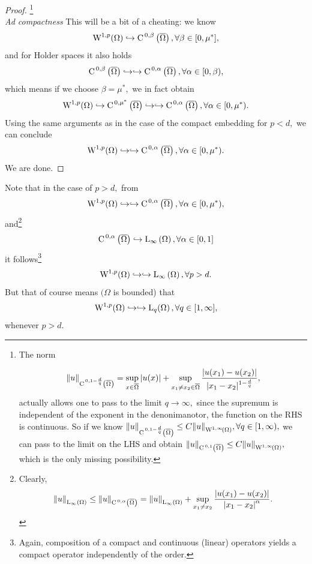 \documentclass{article}
\begin{document}
\begin{proof}
    \footnote{The norm

	    \[
		    \norm{u}_{\text{C}^{\!\, \,0,1- \frac{d}{q}}\!\,\left(\overline{\Omega} \right)} = \sup_{x \in \overline{\Omega}}|u(x)| + \sup_{x_1 \neq x_2 \in \overline{\Omega}} \frac{|u(x_1) - u(x_2)|}{|x_1 - x_2|^{1- \frac{d}{q}}},
	    \]
    actually allows one to pass to the limit $q \to \infty,$ since the supremum is independent of the exponent in the denonimanotor, the function on the RHS is continuous. So if we know $\norm{u}_{\CklSet{0}{1-\frac{d}{q}}{\overline{\Omega}}}\leq C \norm{u}_{\WkpSet[1][\infty]{\Omega}}, \forall q \in [1, \infty),$ we can pass to the limit on the LHS and obtain $\norm{u}_{\CklSet{0}{1}{\overline{\Omega}}}\leq C \norm{u}_{\WkpSet[1][\infty]{\Omega}},$ which is the only missing possibility.}\\


    \textit{Ad compactness}
    This will be a bit of a cheating: we know
    \[
	    \WkpSet[1][p]{\Omega} \hookrightarrow \CklSet{0}{\beta}{\overline{\Omega}}, \forall \beta \in [0,\mu^{*}],
    \]
    and for Holder spaces it also holds
    \[
	    \text{C}^{\!\, \,0,\beta}\!\,\left(\overline{\Omega} \right) \hookrightarrow \hookrightarrow \text{C}^{\!\, \,0,\alpha}\!\,\left(\overline{\Omega} \right), \forall \alpha \in [0,\beta),
    \]
    which means if we choose $\beta = \mu^{*},$ we in fact obtain
    \[
	    \WkpSet[1][p]{\Omega} \hookrightarrow \CklSet{0}{\mu^{*}}{\overline{\Omega}} \hookrightarrow \hookrightarrow \CklSet{0}{\alpha}{\overline{\Omega}}, \forall \alpha \in [0, \mu^{*}).
    \]
    Using the same arguments as in the case of the compact embedding for $p <d, $ we can conclude
    \[
	    \WkpSet[1][p]{\Omega} \hookrightarrow \hookrightarrow \CklSet{0}{\alpha}{\overline{\Omega}}, \forall \alpha \in [0, \mu^{*}).
    \]
    We are done.
\end{proof}

\begin{remark}
    Note that in the case of $p > d,$ from
    \[
	    \WkpSet[1][p]{\Omega} \hookrightarrow \hookrightarrow \CklSet{0}{\alpha}{\overline{\Omega}}, \forall \alpha \in [0,\mu^{*}),
    \]
    and\footnote{Clearly,
	    \[
		    \norm{u}_{\text{L}_{\infty}\!\,\left(\Omega \right)} \leq \norm{u}_{\text{C}^{\!\, \,0,\alpha}\!\,\left(\overline{\Omega} \right)} = \norm{u}_{\text{L}_{\infty}\!\,\left(\Omega \right)} + \sup_{x_1 \neq x_2}\frac{\abs{u(x_1) - u(x_2)}}{\abs{x_1 - x_2}^{\alpha}}.
	    \]
    }
    \[
	    \text{C}^{\!\, \,0,\alpha}\!\,\left(\overline{\Omega} \right) \hookrightarrow \text{L}_{\infty}\!\,\left(\Omega \right), \forall \alpha \in [0,1]
    \]
    it follows\footnote{Again, composition of a compact and continuous (linear) operators yields a compact operator independently of the order.}
    \[
	    \WkpSet[1][p]{\Omega} \hookrightarrow \hookrightarrow \LinfSet{\Omega}, \forall p > d.
    \]
    But that of course means $(\Omega$ is bounded) that
    \[
	    \WkpSet[1][p]{\Omega} \hookrightarrow \hookrightarrow \LpSet[q]{\Omega}, \forall q \in [1,\infty],
    \]
    whenever $p>d.$
\end{remark}
\end{document}
